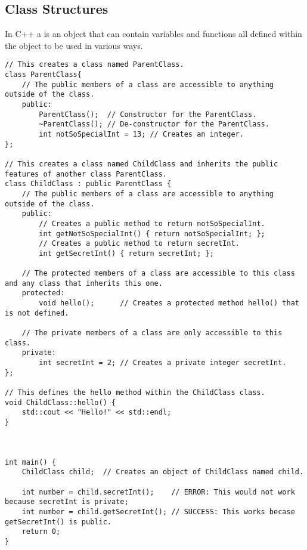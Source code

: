 \subsection{Class Structures}
In C++ a  is an object that can contain variables and functions all defined within the object to be used in various ways.
\begin{lstlisting}
// This creates a class named ParentClass.
class ParentClass{
	// The public members of a class are accessible to anything outside of the class.
	public:
		ParentClass();  // Constructor for the ParentClass.
		~ParentClass(); // De-constructor for the ParentClass.
		int notSoSpecialInt = 13; // Creates an integer.
};

// This creates a class named ChildClass and inherits the public features of another class ParentClass.
class ChildClass : public ParentClass {
	// The public members of a class are accessible to anything outside of the class.
	public:
		// Creates a public method to return notSoSpecialInt.
		int getNotSoSpecialInt() { return notSoSpecialInt; }; 
		// Creates a public method to return secretInt.
		int getSecretInt() { return secretInt; };  
		
	// The protected members of a class are accessible to this class and any class that inherits this one.
	protected:
		void hello();      // Creates a protected method hello() that is not defined.
		
	// The private members of a class are only accessible to this class.
	private:
		int secretInt = 2; // Creates a private integer secretInt.
};

// This defines the hello method within the ChildClass class.
void ChildClass::hello() {
	std::cout << "Hello!" << std::endl;
}



int main() {
	ChildClass child;  // Creates an object of ChildClass named child.
	
	int number = child.secretInt();    // ERROR: This would not work because secretInt is private;
	int number = child.getSecretInt(); // SUCCESS: This works becase getSecretInt() is public.
	return 0;
}
\end{lstlisting}



















